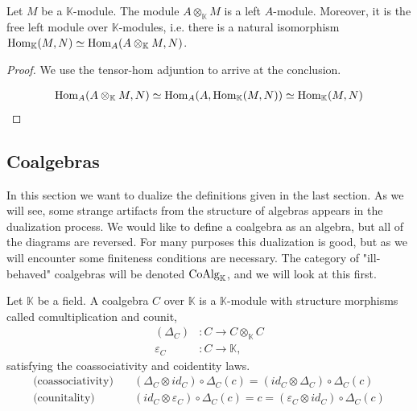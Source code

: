 \documentclass[../thesis.tex]{subfiles}
\begin{document}
            \begin{proposition}\label{prop: free-mod}
                Let $M$ be a $\mathbb{K}$-module. The module $A\otimes_{\mathbb{K}}M$ is a left $A$-module. Moreover, it is the free left module over $\mathbb{K}$-modules, i.e. there is a natural isomorphism $\tt{Hom}_{\mathbb{K}}(M,N)\simeq \tt{Hom}_{A}(A\otimes_{\mathbb{K}}M,N)$.
            \end{proposition}

            \begin{proof}
                We use the tensor-hom adjuntion to arrive at the conclusion.

                \begin{align*}
                    \tt{Hom}_A(A\otimes_\mathbb{K}M, N)\simeq \tt{Hom}_A(A,\tt{Hom}_\mathbb{K}(M,N)) \simeq \tt{Hom}_\mathbb{K}(M,N)
                \end{align*}
            \end{proof}
            
    \subsection{Coalgebras}
            In this section we want to dualize the definitions given in the last section. As we will see, some strange artifacts from the structure of algebras appears in the dualization process. We would like to define a coalgebra as an algebra, but all of the diagrams are reversed. For many purposes this dualization is good, but as we will encounter some finiteness conditions are necessary. The category of "ill-behaved" coalgebras will be denoted $\tt{CoAlg}_\mathbb{K}$, and we will look at this first.

            \begin{definition}
                Let $\mathbb{K}$ be a field. A coalgebra $C$ over $\mathbb{K}$ is a $\mathbb{K}$-module with structure morphisms called comultiplication and counit,
                \begin{align*}
                    (\Delta_C) & : C \rightarrow C\otimes_{\mathbb{K}}C \\
                    \varepsilon_C & : C \rightarrow \mathbb{K},
                \end{align*}
                satisfying the coassociativity and coidentity laws. 
                \begin{align*}
                    \text{(coassociativity)} \quad & (\Delta_C\otimes id_C)\circ\Delta_C(c) = (id_C\otimes\Delta_C)\circ\Delta_C(c) \\
                    \text{(counitality)} \quad & (id_C\otimes\varepsilon_C)\circ\Delta_C(c) = c = (\varepsilon_C\otimes id_C)\circ\Delta_C(c)
                \end{align*}
            \end{definition}
\end{document}
